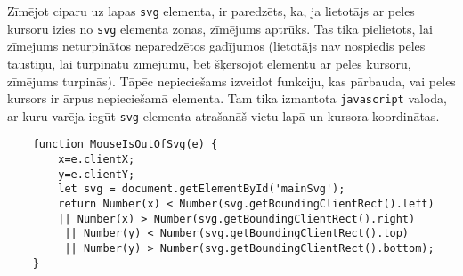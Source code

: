 \par Zīmējot ciparu uz lapas \texttt{svg} elementa, ir paredzēts, ka, ja lietotājs ar peles kursoru izies no \texttt{svg} elementa zonas, zīmējums aptrūks. Tas tika pielietots, lai zīmejums neturpinātos neparedzētos gadījumos (lietotājs nav nospiedis peles taustiņu, lai turpinātu zīmējumu, bet šķērsojot elementu ar peles kursoru, zīmējums turpinās). Tāpēc nepieciešams izveidot funkciju, kas pārbauda, vai peles kursors ir ārpus nepieciešamā elementa. Tam tika izmantota \texttt{javascript} valoda, ar kuru varēja iegūt \texttt{svg} elementa atrašanāš vietu lapā un kursora koordinātas.
{
\begin{verbatim}
    function MouseIsOutOfSvg(e) {
        x=e.clientX;
        y=e.clientY;
        let svg = document.getElementById('mainSvg');
        return Number(x) < Number(svg.getBoundingClientRect().left)
        || Number(x) > Number(svg.getBoundingClientRect().right)
         || Number(y) < Number(svg.getBoundingClientRect().top)
         || Number(y) > Number(svg.getBoundingClientRect().bottom);
    }
\end{verbatim}
}
